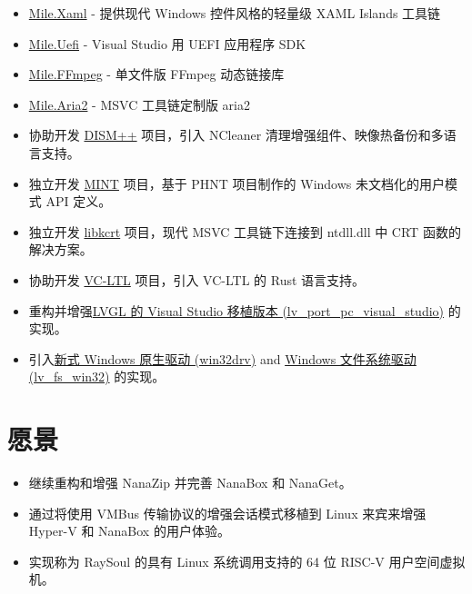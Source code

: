 \documentclass{resume}
\begin{document}
\begin{itemize}
  \item \href{https://github.com/ProjectMile/Mile.Xaml}{Mile.Xaml} - 提供现代 Windows 控件风格的轻量级 XAML Islands 工具链
  \item \href{https://github.com/ProjectMile/Mile.Uefi}{Mile.Uefi} - Visual Studio 用 UEFI 应用程序 SDK
  \item \href{https://github.com/ProjectMile/Mile.FFmpeg}{Mile.FFmpeg} - 单文件版 FFmpeg 动态链接库
  \item \href{https://github.com/ProjectMile/Mile.Aria2}{Mile.Aria2} - MSVC 工具链定制版 aria2
\end{itemize} 

\begin{itemize}
  \item 协助开发 \href{https://github.com/Chuyu-Team/Dism-Multi-language/releases/latest}{DISM++} 项目，引入 NCleaner 清理增强组件、映像热备份和多语言支持。
  \item 独立开发 \href{https://github.com/Chuyu-Team/MINT}{MINT} 项目，基于 PHNT 项目制作的 Windows 未文档化的用户模式 API 定义。
  \item 独立开发 \href{https://github.com/Chuyu-Team/libkcrt}{libkcrt} 项目，现代 MSVC 工具链下连接到 ntdll.dll 中 CRT 函数的解决方案。
  \item 协助开发 \href{https://github.com/Chuyu-Team/VC-LTL5}{VC-LTL} 项目，引入 VC-LTL 的 Rust 语言支持。
\end{itemize}

\begin{itemize}
  \item 重构并增强\href{https://github.com/lvgl/lv_port_pc_visual_studio}{LVGL 的 Visual Studio 移植版本 (lv\_port\_pc\_visual\_studio)} 的实现。
  \item 引入\href{https://github.com/lvgl/lv_drivers/pull/117}{新式 Windows 原生驱动 (win32drv)} and \href{https://github.com/lvgl/lvgl/pull/2701}{Windows 文件系统驱动 (lv\_fs\_win32)} 的实现。
\end{itemize}

\section{愿景}
\begin{itemize}

  \item 继续重构和增强 NanaZip 并完善 NanaBox 和 NanaGet。
  
  \item 通过将使用 VMBus 传输协议的增强会话模式移植到 Linux 来宾来增强 Hyper-V 和 NanaBox 的用户体验。
  
  \item 实现称为 RaySoul 的具有 Linux 系统调用支持的 64 位 RISC-V 用户空间虚拟机。
  
\end{itemize}
\end{document}
